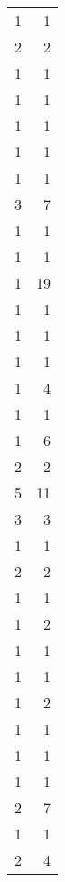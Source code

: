 \begin{tabular}{rr}
                  1 &             1 \\
                  2 &             2 \\
                  1 &             1 \\
                  1 &             1 \\
                  1 &             1 \\
                  1 &             1 \\
                  1 &             1 \\
                  3 &             7 \\
                  1 &             1 \\
                  1 &             1 \\
                  1 &            19 \\
                  1 &             1 \\
                  1 &             1 \\
                  1 &             1 \\
                  1 &             4 \\
                  1 &             1 \\
                  1 &             6 \\
                  2 &             2 \\
                  5 &            11 \\
                  3 &             3 \\
                  1 &             1 \\
                  2 &             2 \\
                  1 &             1 \\
                  1 &             2 \\
                  1 &             1 \\
                  1 &             1 \\
                  1 &             2 \\
                  1 &             1 \\
                  1 &             1 \\
                  1 &             1 \\
                  2 &             7 \\
                  1 &             1 \\
                  2 &             4 \\

\end{tabular}
